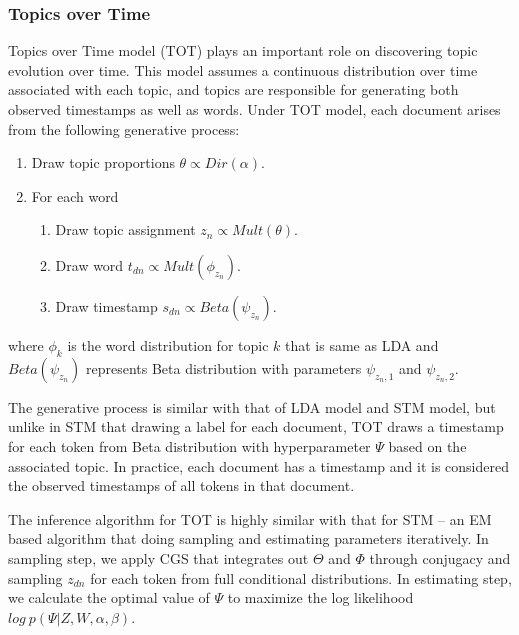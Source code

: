 \documentclass[10pt,journal,cspaper,compsoc]{IEEEtran}
\begin{document}
\subsubsection{Topics over Time}
Topics over Time model (TOT) plays an important role on
discovering topic evolution over time. This model 
assumes a continuous distribution over time associated 
with each topic, and topics are responsible for 
generating both observed timestamps as well as words. 
Under TOT model, each document arises from the following generative process:
\begin{enumerate}
	\item Draw topic proportions $\theta \propto Dir(\alpha)$.
	\item For each word
	\begin{enumerate}
		\item Draw topic assignment $z_n \propto Mult(\theta)$.
		\item Draw word $t_{dn} \propto Mult(\phi_{z_n})$.
		\item Draw timestamp $s_{dn} \propto Beta(\psi_{z_n})$.
	\end{enumerate}
\end{enumerate}
where $\phi_k$ is the word distribution for topic $k$ that is same as LDA and $Beta(\psi_{z_n})$ represents Beta distribution with parameters $\psi_{z_n,1}$ and $\psi_{z_n,2}$.

The generative process is similar with that of LDA model
and STM model, but unlike in STM that drawing a label for each document, TOT draws a timestamp for each token from Beta distribution with hyperparameter $\Psi$ based
on the associated topic. In practice, each document has
a timestamp and it is considered the observed timestamps of
all tokens in that document.

The inference algorithm for TOT is highly similar with that
for STM -- an EM based algorithm that doing sampling and
estimating parameters iteratively. In sampling step, we
apply CGS that integrates out $\Theta$ and $\Phi$ through
conjugacy and sampling $z_{dn}$ for each token from full
conditional distributions. In estimating step, we calculate
the optimal value of $\Psi$ to maximize the log likelihood $log~p(\Psi|Z,W,\alpha,\beta)$.
\end{document}
